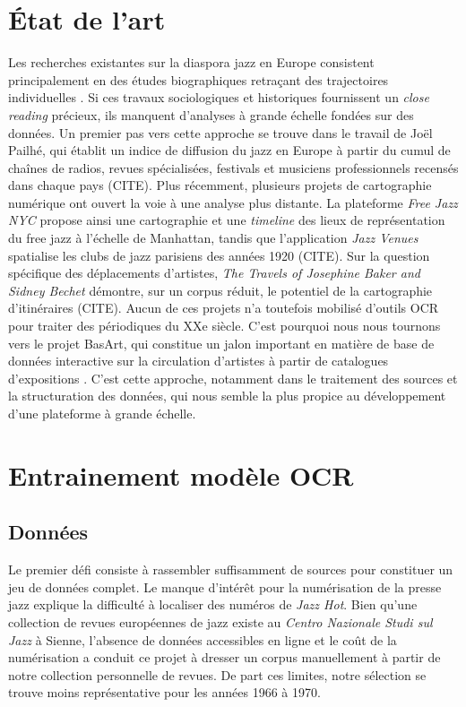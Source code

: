 \documentclass[11pt,french,hyphens]{article}
\begin{document}
\section{État de l'art}
Les recherches existantes sur la diaspora jazz en Europe consistent principalement en des études biographiques retraçant des trajectoires individuelles \cite{Clark2017} \cite{Ross2000} \cite{Braggs2016}. Si ces travaux sociologiques et historiques fournissent un \textit{close reading} précieux, ils manquent d'analyses à grande échelle fondées sur des données.
Un premier pas vers cette approche se trouve dans le travail de Joël Pailhé, qui établit un indice de diffusion du jazz en Europe à partir du cumul de chaînes de radios, revues spécialisées, festivals et musiciens professionnels recensés dans chaque pays (CITE). Plus récemment, plusieurs projets de cartographie numérique ont ouvert la voie à une analyse plus distante. La plateforme \textit{Free Jazz NYC} propose ainsi une cartographie et une \textit{timeline} des lieux de représentation du free jazz à l'échelle de Manhattan, tandis que l'application \textit{Jazz Venues} spatialise les clubs de jazz parisiens des années 1920 (CITE). Sur la question spécifique des déplacements d'artistes, \textit{The Travels of Josephine Baker and Sidney Bechet} démontre, sur un corpus réduit, le potentiel de la cartographie d'itinéraires (CITE).
Aucun de ces projets n'a toutefois mobilisé d'outils OCR pour traiter des périodiques du XXe siècle. C'est pourquoi nous nous tournons vers le projet BasArt, qui constitue un jalon important en matière de base de données interactive sur la circulation d'artistes à partir de catalogues d'expositions \cite{BasArt}. C'est cette approche, notamment dans le traitement des sources et la structuration des données, qui nous semble la plus propice au développement d'une plateforme à grande échelle.


\section{Entrainement modèle OCR}

\subsection{Données}
Le premier défi consiste à rassembler suffisamment de sources pour constituer un jeu de données complet. Le manque d'intérêt pour la numérisation de la presse jazz explique la difficulté à localiser des numéros de \textit{Jazz Hot}. Bien qu'une collection de revues européennes de jazz existe au \textit{Centro Nazionale Studi sul Jazz} à Sienne, l'absence de données accessibles en ligne et le coût de la numérisation  a conduit ce projet à dresser un corpus manuellement à partir de notre collection personnelle de revues. De part ces limites, notre sélection se trouve moins représentative pour les années 1966 à 1970.
\end{document}
